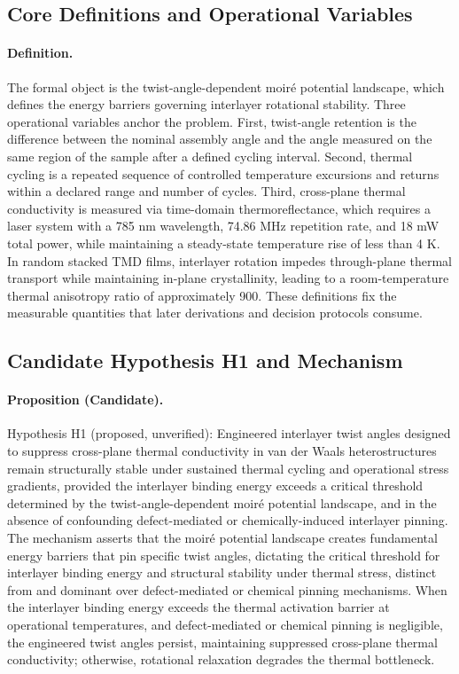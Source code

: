 \documentclass[conference]{IEEEtran}
\begin{document}
\subsection{Core Definitions and Operational Variables}
\paragraph{Definition.} The formal object is the twist-angle-dependent moiré potential landscape, which defines the energy barriers governing interlayer rotational stability. Three operational variables anchor the problem. First, twist-angle retention is the difference between the nominal assembly angle and the angle measured on the same region of the sample after a defined cycling interval. Second, thermal cycling is a repeated sequence of controlled temperature excursions and returns within a declared range and number of cycles. Third, cross-plane thermal conductivity is measured via time-domain thermoreflectance, which requires a laser system with a 785 nm wavelength, 74.86 MHz repetition rate, and 18 mW total power, while maintaining a steady-state temperature rise of less than 4 K. In random stacked TMD films, interlayer rotation impedes through-plane thermal transport while maintaining in-plane crystallinity, leading to a room-temperature thermal anisotropy ratio of approximately 900. These definitions fix the measurable quantities that later derivations and decision protocols consume.~\cite{cite_26ecaf73d88dfe33}

\subsection{Candidate Hypothesis H1 and Mechanism}
\paragraph{Proposition (Candidate).} Hypothesis H1 (proposed, unverified): Engineered interlayer twist angles designed to suppress cross-plane thermal conductivity in van der Waals heterostructures remain structurally stable under sustained thermal cycling and operational stress gradients, provided the interlayer binding energy exceeds a critical threshold determined by the twist-angle-dependent moiré potential landscape, and in the absence of confounding defect-mediated or chemically-induced interlayer pinning. The mechanism asserts that the moiré potential landscape creates fundamental energy barriers that pin specific twist angles, dictating the critical threshold for interlayer binding energy and structural stability under thermal stress, distinct from and dominant over defect-mediated or chemical pinning mechanisms. When the interlayer binding energy exceeds the thermal activation barrier at operational temperatures, and defect-mediated or chemical pinning is negligible, the engineered twist angles persist, maintaining suppressed cross-plane thermal conductivity; otherwise, rotational relaxation degrades the thermal bottleneck.
\end{document}
